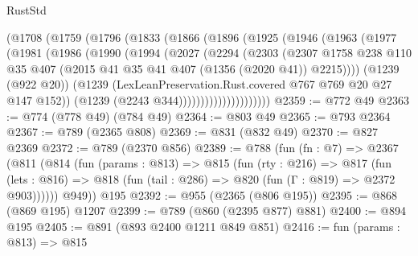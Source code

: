 \begin{lexlean}{RustStd}
\begin{coremodule}
            (@1708
              (@1759
                (@1796
                  (@1833
                    (@1866
                      (@1896
                        (@1925
                          (@1946
                            (@1963
                              (@1977
                                (@1981
                                  (@1986
                                    (@1990
                                      (@1994
                                        (@2027
                                          (@2294
                                            (@2303
                                              (@2307
                                                @1758
                                                @238
                                                @110
                                                @35
                                                @407
                                                (@2015
                                                  @41
                                                  @35
                                                  @41
                                                  @407
                                                  (@1356 (@2020 @41))
                                                  @2215))))
                                          (@1239 (@922 @20))
                                          (@1239
                                            (LexLeanPreservation.Rust.covered
                                              @767
                                              @769
                                              @20
                                              @27
                                              @147
                                              @152))
                                          (@1239 (@2243 @344)))))))))))))))))))))
@2359 := @772 @49
@2363 := @774 (@778 @49) (@784 @49)
@2364 := @803 @49
@2365 := @793 @2364
@2367 := @789 (@2365 @808)
@2369 := @831 (@832 @49)
@2370 := @827 @2369
@2372 := @789 (@2370 @856)
@2389 := @788
    (fun (fn : @7) =>
    @2367
      (@811
        (@814
          (fun (params : @813) =>
          @815
            (fun (rty : @216) =>
            @817
              (fun (lets : @816) =>
              @818 (fun (tail : @286) => @820 (fun (Γ : @819) => @2372 @903))))))
        @949))
    @195
@2392 := @955 (@2365 (@806 @195))
@2395 := @868 (@869 @195) @1207
@2399 := @789 (@860 (@2395 @877) @881)
@2400 := @894 @195
@2405 := @891 (@893 @2400 @1211 @849 @851)
@2416 := fun (params : @813) =>
  @815

\end{coremodule}
\end{lexlean}

